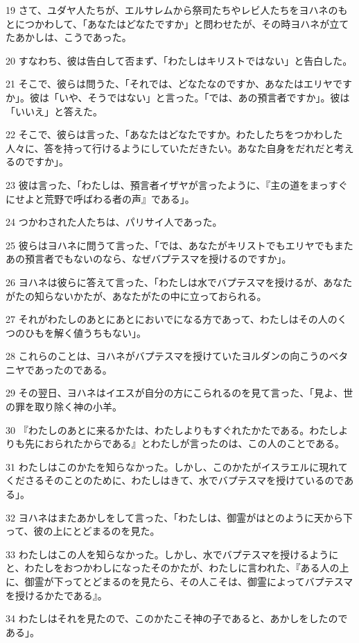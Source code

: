 \par 19 さて、ユダヤ人たちが、エルサレムから祭司たちやレビ人たちをヨハネのもとにつかわして、「あなたはどなたですか」と問わせたが、その時ヨハネが立てたあかしは、こうであった。
\par 20 すなわち、彼は告白して否まず、「わたしはキリストではない」と告白した。
\par 21 そこで、彼らは問うた、「それでは、どなたなのですか、あなたはエリヤですか」。彼は「いや、そうではない」と言った。「では、あの預言者ですか」。彼は「いいえ」と答えた。
\par 22 そこで、彼らは言った、「あなたはどなたですか。わたしたちをつかわした人々に、答を持って行けるようにしていただきたい。あなた自身をだれだと考えるのですか」。
\par 23 彼は言った、「わたしは、預言者イザヤが言ったように、『主の道をまっすぐにせよと荒野で呼ばわる者の声』である」。
\par 24 つかわされた人たちは、パリサイ人であった。
\par 25 彼らはヨハネに問うて言った、「では、あなたがキリストでもエリヤでもまたあの預言者でもないのなら、なぜバプテスマを授けるのですか」。
\par 26 ヨハネは彼らに答えて言った、「わたしは水でバプテスマを授けるが、あなたがたの知らないかたが、あなたがたの中に立っておられる。
\par 27 それがわたしのあとにあとにおいでになる方であって、わたしはその人のくつのひもを解く値うちもない」。
\par 28 これらのことは、ヨハネがバプテスマを授けていたヨルダンの向こうのベタニヤであったのである。
\par 29 その翌日、ヨハネはイエスが自分の方にこられるのを見て言った、「見よ、世の罪を取り除く神の小羊。
\par 30 『わたしのあとに来るかたは、わたしよりもすぐれたかたである。わたしよりも先におられたからである』とわたしが言ったのは、この人のことである。
\par 31 わたしはこのかたを知らなかった。しかし、このかたがイスラエルに現れてくださるそのことのために、わたしはきて、水でバプテスマを授けているのである」。
\par 32 ヨハネはまたあかしをして言った、「わたしは、御霊がはとのように天から下って、彼の上にとどまるのを見た。
\par 33 わたしはこの人を知らなかった。しかし、水でバプテスマを授けるようにと、わたしをおつかわしになったそのかたが、わたしに言われた、『ある人の上に、御霊が下ってとどまるのを見たら、その人こそは、御霊によってバプテスマを授けるかたである』。
\par 34 わたしはそれを見たので、このかたこそ神の子であると、あかしをしたのである」。
